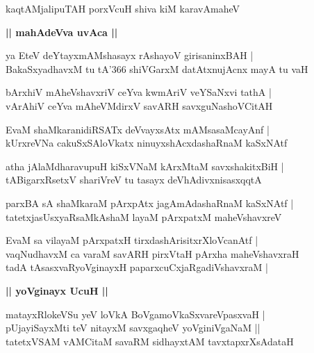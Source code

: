 \documentclass[twoside,12pt,openright]{book}
\newcounter{shloka}[chapter]
\def\uvaca#1{\centerline{{\large\textbf{#1}}}}
\begin{document}
\begin{shloka}%
kaqtAMjalipuTAH porxVcuH shiva kiM karavAmaheV 
\end{shloka}

\uvaca{|| mahAdeVva uvAca ||}

\begin{shloka}%
ya EteV deYtayxmAMshasayx rAshayoV girisaninxBAH |\\
BakaSxyadhavxM tu tA\char'366 shiVGarxM datAtxnujAcnx mayA tu vaH
\end{shloka}

\begin{shloka}%
bArxhiV mAheVshavxriV ceYva kwmAriV veYSaNxvi tathA |\\
vArAhiV ceYva mAheVMdirxV savARH savxguNashoVCitAH
\end{shloka}

\begin{shloka}%
EvaM shaMkaranidiRSATx deVvayxsAtx mAMsasaMcayAnf |\\
kUrxreVNa cakuSxSAloVkatx ninuyxshAcxdashaRnaM kaSxNAtf
\end{shloka}

\begin{shloka}%
atha jAlaMdharavupuH kiSxVNaM kArxMtaM savxshakitxBiH |\\
tABigarxRsetxV shariVreV tu tasayx deVhAdivxnisasxqqtA
\end{shloka}

\begin{shloka}%
parxBA sA shaMkaraM pArxpAtx jagAmAdashaRnaM kaSxNAtf |\\
tatetxjasUsxyaRsaMkAshaM layaM pArxpatxM maheVshavxreV 
\end{shloka}

\begin{shloka}%
EvaM sa vilayaM pArxpatxH tirxdashArisitxrXloVcanAtf |\\
vaqNudhavxM ca varaM savARH pirxVtaH pArxha maheVshavxraH \\
tadA tAsasxvaRyoVginayxH paparxcuCxjaRgadiVshavxraM |
\end{shloka}

\uvaca{|| yoVginayx UcuH ||}

\begin{shloka}%
matayxRlokeVSu yeV loVkA BoVgamoVkaSxvareVpasxvaH |\\
pUjayiSayxMti teV nitayxM savxgaqheV yoVginiVgaNaM ||\\
tatetxVSAM vAMCitaM savaRM sidhayxtAM tavxtapxrXsAdataH
\end{shloka}
\end{document}
